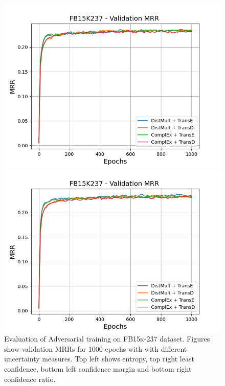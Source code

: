 \begin{figure}[H]
\begin{minipage}{.45\textwidth}
      \includegraphics[width=0.9\linewidth]{figures/results/gan_train/not_pretrained/uncertainty/max_distribution/confidence_margin/fb15k237/uncertainty_fb15k237_mrrs.png}
    \end{minipage}%
    \begin{minipage}{.45\textwidth}
      \centering
      \includegraphics[width=0.9\linewidth]{figures/results/gan_train/not_pretrained/uncertainty/max_distribution/confidence_ratio/fb15k237/uncertainty_fb15k237_mrrs.png}
    \end{minipage}%
    \caption{Evaluation of Adversarial training on \textsc{FB15k-237} dataset. 
    Figures show validation MRRs for 1000 epochs with \ussoftmax with different uncertainty measures.
    Top left shows entropy, top right least confidence, 
    bottom left confidence margin and bottom right confidence ratio.}
    \label{fig:advtrain_measures_fb15k237}
\end{figure}


